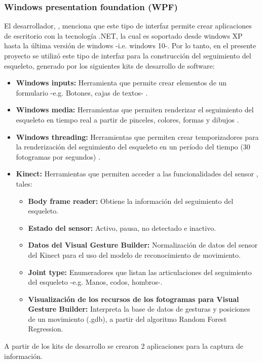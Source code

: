 \subsubsection{Windows presentation foundation (WPF)}
\label{ins:UI:wpf}
El desarrollador, , menciona que este tipo de interfaz permite crear aplicaciones de escritorio con la tecnolog\'ia .NET, la cual es soportado desde windows XP hasta la \'ultima versi\'on de windows -i.e. windows 10-. Por lo tanto, en el presente proyecto se utiliz\'o este tipo de interfaz para la construcci\'on del seguimiento del esqueleto, generado por los siguientes kits de desarrollo de software:
\begin{itemize}
	\item \textbf{Windows inputs:} Herramienta que permite crear elementos de un formulario -e.g. Botones, cajas de textos- \cite{wpfWindows2019}.
	\item \textbf{Windows media:} Herramientas que permiten renderizar el seguimiento del esqueleto en tiempo real a partir de pinceles, colores, formas y dibujos \cite{WindowMedia2019}.
	\item \textbf{Windows threading:} Herramientas que permiten crear temporizadores para la renderizaci\'on del seguimiento del esqueleto en un per\'iodo del tiempo (30 fotogramas por segundos) \cite{WindowThreading2019}.
	\item \textbf{Kinect:} Herramientas que permiten acceder a las funcionalidades del sensor \cite{WindowKinect2019}, tales:
	\begin{itemize}
					\item \textbf{Body frame reader:} Obtiene la informaci\'on del seguimiento del esqueleto.
				\item \textbf{Estado del sensor:} Activo, pausa, no detectado e inactivo.
				\item \textbf{Datos del Visual Gesture Builder:} Normalizaci\'on de datos del sensor del Kinect para el uso del modelo de reconocimiento de movimiento.
			\item \textbf{Joint type:} Enumeradores que listan las articulaciones del seguimiento del esqueleto -e.g. Manos, codos, hombros-.
			\item \textbf{Visualizaci\'on de los recursos de los fotogramas para Visual Gesture Builder:} Interpreta la base de datos de gesturas y posiciones de un movimiento (.gdb), a partir del algoritmo Random Forest Regression.
	\end{itemize}	 
\end{itemize}
A partir de los kits de desarrollo se crearon 2 aplicaciones para la captura de informaci\'on.
